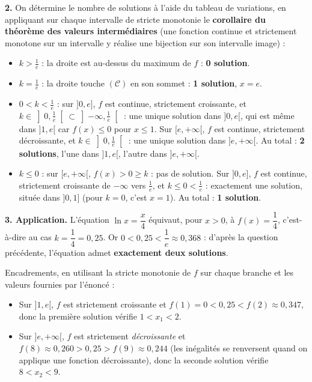 \documentclass[11pt]{article}
\begin{document}
\begin{corrige}
\textbf{2.} On détermine le nombre de solutions à l'aide du tableau de variations, en appliquant sur chaque intervalle de stricte monotonie le \textbf{corollaire du théorème des valeurs intermédiaires} (une fonction continue et strictement monotone sur un intervalle y réalise une bijection sur son intervalle image) :
\begin{itemize}
\item $\boxed{k > \frac{1}{e}}$ : la droite est au-dessus du maximum de $f$ : \textbf{0 solution}.
\item $\boxed{k = \frac{1}{e}}$ : la droite touche $(\mathcal{C})$ en son sommet : \textbf{1 solution}, $x=e$.
\item $\boxed{0 < k < \frac{1}{e}}$ : sur $]0,e]$, $f$ est continue, strictement croissante, et $k \in \left]0,\frac{1}{e}\right[ \subset \left]-\infty,\frac{1}{e}\right[$ : une unique solution dans $]0,e[$, qui est même dans $]1,e[$ car $f(x)\leq 0$ pour $x\leq 1$. Sur $[e,+\infty[$, $f$ est continue, strictement décroissante, et $k \in \left]0,\frac{1}{e}\right[$ : une unique solution dans $]e,+\infty[$. Au total : \textbf{2 solutions}, l'une dans $]1,e[$, l'autre dans $]e,+\infty[$.
\item $\boxed{k \leq 0}$ : sur $[e,+\infty[$, $f(x)>0 \geq k$ : pas de solution. Sur $]0,e]$, $f$ est continue, strictement croissante de $-\infty$ vers $\frac{1}{e}$, et $k \leq 0 < \frac{1}{e}$ : exactement une solution, située dans $]0,1]$ (pour $k=0$, c'est $x=1$). Au total : \textbf{1 solution}.
\end{itemize}

\textbf{3. Application.} L'équation $\ln x = \dfrac{x}{4}$ équivaut, pour $x>0$, à $f(x) = \dfrac{1}{4}$, c'est-à-dire au cas $k = \dfrac{1}{4} = 0{,}25$.
Or $0 < 0{,}25 < \dfrac{1}{e} \approx 0{,}368$ : d'après la question précédente, l'équation admet \textbf{exactement deux solutions}.

Encadrements, en utilisant la stricte monotonie de $f$ sur chaque branche et les valeurs fournies par l'énoncé :
\begin{itemize}
\item Sur $]1,e[$, $f$ est strictement croissante et $f(1) = 0 < 0{,}25 < f(2) \approx 0{,}347$, donc la première solution vérifie $\boxed{1 < x_1 < 2}$.
\item Sur $]e,+\infty[$, $f$ est strictement \emph{décroissante} et $f(8) \approx 0{,}260 > 0{,}25 > f(9) \approx 0{,}244$ (les inégalités se renversent quand on applique une fonction décroissante), donc la seconde solution vérifie $\boxed{8 < x_2 < 9}$.
\end{itemize}


\end{corrige}
\end{document}
